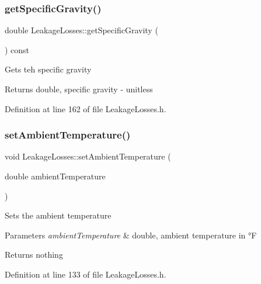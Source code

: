 \subsubsection{\texorpdfstring{get\+Specific\+Gravity()}{getSpecificGravity()}\hspace{0.1cm}{\footnotesize\ttfamily [3/3]}}
{\footnotesize\ttfamily double Leakage\+Losses\+::get\+Specific\+Gravity (\begin{DoxyParamCaption}{ }\end{DoxyParamCaption}) const\hspace{0.3cm}{\ttfamily [inline]}}

Gets teh specific gravity

\begin{DoxyReturn}{Returns}
double, specific gravity -\/ unitless 
\end{DoxyReturn}


Definition at line 162 of file Leakage\+Losses.\+h.

\mbox{\label{class_leakage_losses_aa6028111b3eb305d9ea6f9efea7c6c66}} 
\subsubsection{\texorpdfstring{set\+Ambient\+Temperature()}{setAmbientTemperature()}\hspace{0.1cm}{\footnotesize\ttfamily [1/3]}}
{\footnotesize\ttfamily void Leakage\+Losses\+::set\+Ambient\+Temperature (\begin{DoxyParamCaption}\item[{double}]{ambient\+Temperature }\end{DoxyParamCaption})\hspace{0.3cm}{\ttfamily [inline]}}

Sets the ambient temperature


\begin{DoxyParams}{Parameters}
{\em ambient\+Temperature} & double, ambient temperature in °F\\
\hline
\end{DoxyParams}
\begin{DoxyReturn}{Returns}
nothing 
\end{DoxyReturn}


Definition at line 133 of file Leakage\+Losses.\+h.

